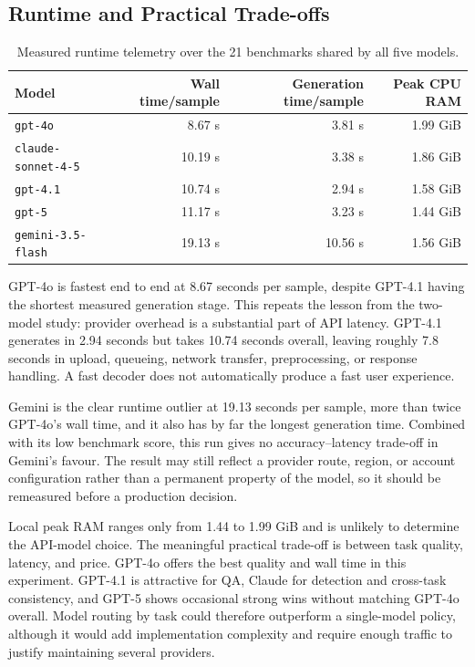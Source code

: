 ﻿\documentclass[11pt,a4paper]{article}
\begin{document}
\subsection{Runtime and Practical Trade-offs}

\begin{table}[H]
\centering
\small
\caption{Measured runtime telemetry over the 21 benchmarks shared by all five
models.}
\label{tab:five-api-runtime}
\begin{tabularx}{\textwidth}{@{}Xrrr@{}}
\toprule
\textbf{Model} & \textbf{Wall time/sample} &
\textbf{Generation time/sample} & \textbf{Peak CPU RAM} \\
\midrule
\texttt{gpt-4o} & 8.67 s & 3.81 s & 1.99 GiB \\
\texttt{claude-sonnet-4-5} & 10.19 s & 3.38 s & 1.86 GiB \\
\texttt{gpt-4.1} & 10.74 s & 2.94 s & 1.58 GiB \\
\texttt{gpt-5} & 11.17 s & 3.23 s & 1.44 GiB \\
\texttt{gemini-3.5-flash} & 19.13 s & 10.56 s & 1.56 GiB \\
\bottomrule
\end{tabularx}
\end{table}

GPT-4o is fastest end to end at 8.67 seconds per sample, despite GPT-4.1
having the shortest measured generation stage. This repeats the lesson from
the two-model study: provider overhead is a substantial part of API latency.
GPT-4.1 generates in 2.94 seconds but takes 10.74 seconds overall, leaving
roughly 7.8 seconds in upload, queueing, network transfer, preprocessing, or
response handling. A fast decoder does not automatically produce a fast user
experience.

Gemini is the clear runtime outlier at 19.13 seconds per sample, more than
twice GPT-4o's wall time, and it also has by far the longest generation time.
Combined with its low benchmark score, this run gives no accuracy--latency
trade-off in Gemini's favour. The result may still reflect a provider route,
region, or account configuration rather than a permanent property of the
model, so it should be remeasured before a production decision.

Local peak RAM ranges only from 1.44 to 1.99 GiB and is unlikely to determine
the API-model choice. The meaningful practical trade-off is between task
quality, latency, and price. GPT-4o offers the best quality and wall time in
this experiment. GPT-4.1 is attractive for QA, Claude for detection and
cross-task consistency, and GPT-5 shows occasional strong wins without
matching GPT-4o overall. Model routing by task could therefore outperform a
single-model policy, although it would add implementation complexity and
require enough traffic to justify maintaining several providers.
\end{document}
